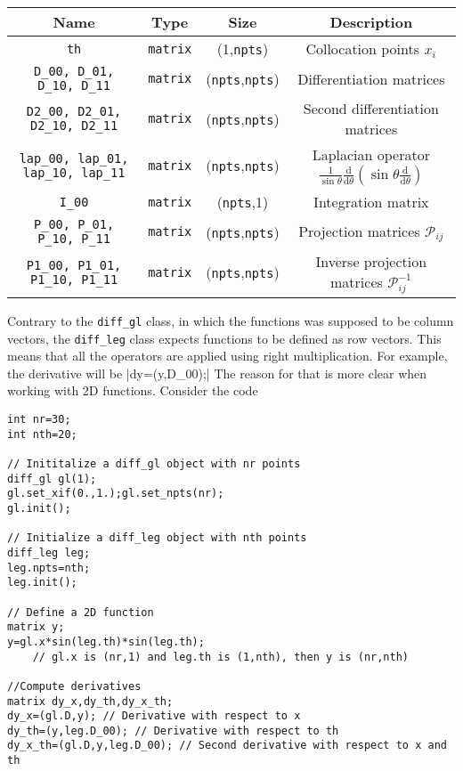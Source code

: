 \medskip
\begin{tabular}{cccc}
Name&Type&Size&Description\\
\hline
\texttt{th}&\texttt{matrix}&(1,\texttt{npts})& Collocation points $x_i$\\
\texttt{D\_00, D\_01, D\_10, D\_11}&\texttt{matrix}&
(\texttt{npts},\texttt{npts})&Differentiation matrices\\
\texttt{D2\_00, D2\_01, D2\_10, D2\_11}&\texttt{matrix}&
(\texttt{npts},\texttt{npts})&Second differentiation matrices\\
\texttt{lap\_00, lap\_01, lap\_10, lap\_11}&\texttt{matrix}&
(\texttt{npts},\texttt{npts})&Laplacian operator
$\frac{1}{\sin\theta}\frac{\mathrm{d}}{\mathrm{d}\theta}\left(\sin\theta\frac{\mathrm{d}}{\mathrm{d}\theta}\right)$\\
\texttt{I\_00}&\texttt{matrix}&(\texttt{npts},1)&Integration matrix\\
\texttt{P\_00, P\_01, P\_10, P\_11}&\texttt{matrix}&
(\texttt{npts},\texttt{npts})&Projection matrices $\mathcal{P}_{ij}$\\
\texttt{P1\_00, P1\_01, P1\_10, P1\_11}&\texttt{matrix}&
(\texttt{npts},\texttt{npts})&Inverse projection matrices $\mathcal{P}^{-1}_{ij}$\\
\end{tabular}
\medskip

Contrary to the \texttt{diff\_gl} class, in which the functions was supposed to be column vectors,
the \texttt{diff\_leg} class expects functions to be defined as row vectors. This means that
all the operators are applied using right multiplication. For example, the derivative will be
|dy=(y,D_00);|
The reason for that is more clear when working with 2D functions. Consider the code
\begin{verbatim}
int nr=30;
int nth=20;

// Inititalize a diff_gl object with nr points
diff_gl gl(1);
gl.set_xif(0.,1.);gl.set_npts(nr);
gl.init();

// Initialize a diff_leg object with nth points
diff_leg leg;
leg.npts=nth;
leg.init();

// Define a 2D function 
matrix y;
y=gl.x*sin(leg.th)*sin(leg.th);
	// gl.x is (nr,1) and leg.th is (1,nth), then y is (nr,nth)

//Compute derivatives
matrix dy_x,dy_th,dy_x_th;
dy_x=(gl.D,y); // Derivative with respect to x
dy_th=(y,leg.D_00); // Derivative with respect to th
dy_x_th=(gl.D,y,leg.D_00); // Second derivative with respect to x and th

\end{verbatim}

